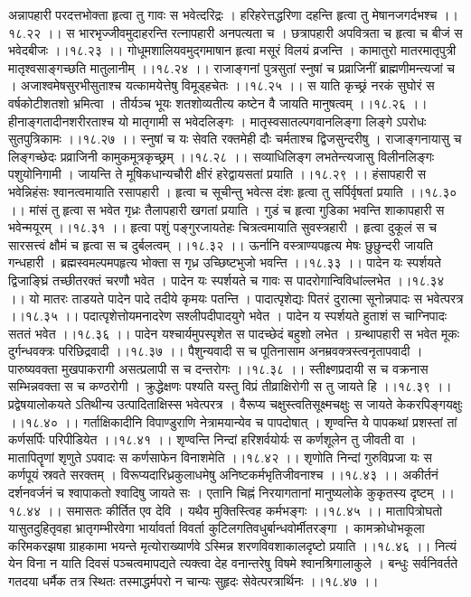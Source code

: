 \documentclass[11pt]{book}
\begin{document}
\begin{landscape}
अन्नापहारी परदत्तभोक्ता
हृत्वा तु गावः स भवेत्दरिद्रः ।
हरिहरेत्तद्धरिणा दहन्ति
हृत्वा तु मेषानजगर्दभश्च ।।१८.२२ ।।
स भारभृज्जीवमुदाहरन्ति
रत्नापहारी अनपत्यता च ।
छत्रापहारी अपवित्रता च
हृत्वा च बीजं स भवेदबीजः ।।१८.२३ ।।
गोधूमशालियवमुद्गमाषान
हृत्वा मसूरं विलयं व्रजन्ति ।
कामातुरो मातरमातृपुत्री
मातृश्वसाङ्गच्छति मातुलानीम् ।।१८.२४ ।।
राजाङ्गनां पुत्रसुतां स्नुषां च
प्रव्राजिनीं ब्राह्मणीमन्त्यजां च । 
अजाश्वमेषसुरभीसुताश्च
यत्कामयेत्तेषु विमूड्हचेतः ।।१८.२५ ।।
स याति कृच्छ्रं नरकं सुघोरं
स वर्षकोटीशतशो भ्रमित्वा ।
तीर्यञ्च भूयः शतशोव्यतीत्य
कष्टेन वै जायति मानुषत्वम् ।।१८.२६ ।।
हीनाङ्गतादीनशरीरताश्च
यो मातृगामी स भवेदलिङ्गः ।
मातृस्वसातल्पगवानलिङ्गा
लिङ्गे ऽपरोधः सुतपुत्रिकामः ।।१८.२७ ।।
स्नुषां च यः सेवति रक्तमेही
दौः चर्मताश्च द्विजसुन्दरीषु ।
राजाङ्गनायासु च लिङ्गच्छेदः
प्रव्राजिनी कामुकमूत्रकृच्छ्रम् ।।१८.२८ ।।
सव्याधिलिङ्ग लभतेन्त्यजासु
विलीनलिङ्गः पशुयोनिगामी ।
जायन्ति ते मूषिकधान्यचौरी
क्षीरं हरेद्वायसतां प्रयाति ।।१८.२९ ।।
हंसापहारी स भवेन्निहंसः
श्वानत्वमायाति रसापहारी ।
हृत्वा च सूचीन्तु भवेत्स दंशः
हृत्वा तु सर्पिर्वृषतां प्रयाति ।।१८.३० ।।
मांसं तु हृत्वा स भवेत गृध्रः
तैलापहारी खगतां प्रयाति ।
गुडं च हृत्वा गुडिका भवन्ति
शाकापहारी स भवेन्मयूरम् ।।१८.३१ ।।
हृत्वा पशुं पङ्गुरजायतेहः
चित्रत्वमायाति सुवस्त्रहारी ।
हृत्वा दुकूलं स च सारसत्त्वं
क्षौमं च हृत्वा स च दुर्बलत्वम् ।।१८.३२ ।।
ऊर्नानि वस्त्राण्यपहृत्य मेषः
छुछुन्दरी जायति गन्धहारी ।
ब्रह्मस्वमल्पमपहृत्य भोक्ता
स गृध्र उच्छिष्टभुजो भवन्ति ।।१८.३३ ।।
पादेन यः स्पर्शयते द्विजाङ्घ्रिं
तच्छीतरक्तं चरणौ भवेत ।
पादेन यः स्पर्शयते च गावः
स पादरोगान्विविधांल्लभेत ।।१८.३४ ।।
यो मातरः ताडयते पादेन
पादे तदीये कृमयः पतन्ति ।
पादात्पृशेद्यः पितरं दुरात्मा
सूनोन्नपादः स भवेत्परत्र ।।१८.३५ ।।
पदात्पृशेत्तोयमनादरेण
सश्लीपदीपादयुगे भवेत ।
पादेन य स्पर्शयते हुताशं
स चाग्निपादः सततं भवेत ।।१८.३६ ।।
पादेन यश्चार्यमुपस्पृशेत
स पादच्छेदं बहुशो लभेत ।
ग्रन्थापहारी स भवेत मूकः
दुर्गन्धवक्त्रः परिछिद्रवादी ।।१८.३७ ।।
पैशुन्यवादी स च पूतिनासाम
अनम्रवक्त्रस्त्वनृतापवादी ।
पारुष्यवक्ता मुखपाकरागी
असत्प्रलापी स च दन्तरोगः ।।१८.३८ ।।
स्तीक्ष्णप्रदायी स च वक्रनास
सम्भिन्नवक्ता स च कण्ठरोगी ।
क्रुद्धेक्षणः पश्यति यस्तु विप्रं
तीव्राक्षिरोगी स तु जायते हि ।।१८.३९ ।।
प्रद्वेषयालोकयते ऽतिथीन्य
उत्पादिताक्षिस्स भवेत्परत्र ।
वैरूप्य चक्षुस्त्वतिसूक्ष्मचक्षुः
स जायते केकरपिङ्गयक्षुः ।।१८.४० ।।
गर्ताक्षिकादीनि विपाण्डुराणि
नेत्रामयान्येव च पापदोषात् ।
शृण्वन्ति ये पापकथां प्रशस्तां
तां कर्णसर्पिः परिपीडियेत ।।१८.४१ ।।
शृण्वन्ति निन्दां हरिशर्वयोर्यः
स कर्णशूलेन तु जीवती वा ।
मातापितॄणां शृणुते ऽपवादः
स कर्णसाफेन विनाशमेति ।।१८.४२ ।।
शृणोति निन्दां गुरुविप्रजा यः
स कर्णपूयं स्रवते सरक्तम् ।
विरूप्यदारिध्रकुलाधमेषु
अनिष्टकर्मभृतिजीवनाश्च ।।१८.४३ ।।
अकीर्तनं दर्शनवर्जनं च
श्वापाकतो श्वादिषु जायते सः ।
एतानि चिह्नं निरयागतानां
मानुष्यलोके कुकृतस्य दृष्टम् ।।१८.४४ ।।
समासतः कीर्तित एव देवि ।
यथैव मुक्तिस्त्विह कर्मभङ्गः ।।१८.४५ ।।
मातापित्रोघतो यासुतदुहितृवहा भ्रातृगम्भीरवेगा
भार्यावर्ता विवर्ता कुटिलगतिवधुर्बान्धवोर्मीतरङ्गा ।
कामक्रोधोभकूला करिमकरझषा ग्राहकामा भयन्ते
मृत्योराख्यार्णवे ऽस्मिन्न शरणविवशाकालदृष्टो प्रयाति ।।१८.४६ ।।
नित्यं येन विना न याति दिवसं पञ्चत्वमापद्यते
त्यक्त्वा देह वनान्तरेषु विषमे श्वानश्रिगालाकुले ।
बन्धुः सर्वनिवर्तते गतदया धर्मैक तत्र स्थितः
तस्माद्धर्मपरो न चान्यः सुहृदः सेवेत्परत्रार्थिनः ।।१८.४७ ।।


\end{landscape}
\end{document}
